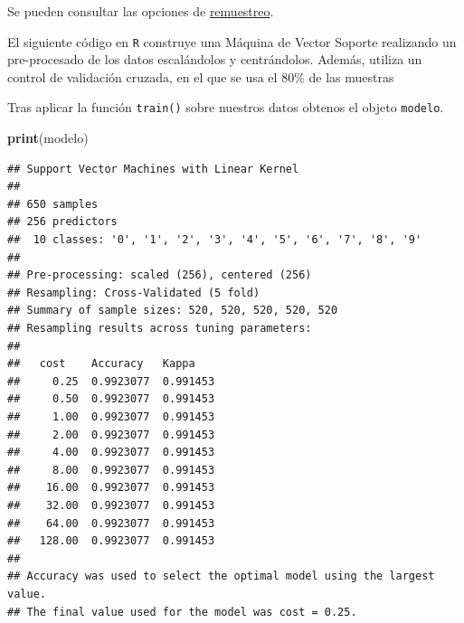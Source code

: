\documentclass[12pt,spanish,a4paper]{article}
\newenvironment{Shaded}{\begin{snugshade}}{\end{snugshade}}
\newcommand{\DataTypeTok}[1]{\textcolor[rgb]{0.13,0.29,0.53}{#1}}
\newcommand{\DecValTok}[1]{\textcolor[rgb]{0.00,0.00,0.81}{#1}}
\newcommand{\FloatTok}[1]{\textcolor[rgb]{0.00,0.00,0.81}{#1}}
\newcommand{\KeywordTok}[1]{\textcolor[rgb]{0.13,0.29,0.53}{\textbf{#1}}}
\newcommand{\NormalTok}[1]{#1}
\newcommand{\OperatorTok}[1]{\textcolor[rgb]{0.81,0.36,0.00}{\textbf{#1}}}
\newcommand{\OtherTok}[1]{\textcolor[rgb]{0.56,0.35,0.01}{#1}}
\newcommand{\StringTok}[1]{\textcolor[rgb]{0.31,0.60,0.02}{#1}}
\numberwithin{equation}{section}
\begin{document}
Se pueden consultar las opciones de
\href{http://topepo.github.io/caret/subsampling-for-class-imbalances.html}{remuestreo}.

El siguiente código en \texttt{R} construye una Máquina de Vector
Soporte realizando un pre-procesado de los datos escalándolos y
centrándolos. Además, utiliza un control de validación cruzada, en el
que se usa el 80\% de las muestras

\begin{Shaded}
\end{Shaded}

Tras aplicar la función \texttt{train()} sobre nuestros datos obtenos el
objeto \texttt{modelo}.

\begin{Shaded}
\begin{Highlighting}[]
\KeywordTok{print}\NormalTok{(modelo)}
\end{Highlighting}
\end{Shaded}

\begin{verbatim}
## Support Vector Machines with Linear Kernel 
## 
## 650 samples
## 256 predictors
##  10 classes: '0', '1', '2', '3', '4', '5', '6', '7', '8', '9' 
## 
## Pre-processing: scaled (256), centered (256) 
## Resampling: Cross-Validated (5 fold) 
## Summary of sample sizes: 520, 520, 520, 520, 520 
## Resampling results across tuning parameters:
## 
##   cost    Accuracy   Kappa   
##     0.25  0.9923077  0.991453
##     0.50  0.9923077  0.991453
##     1.00  0.9923077  0.991453
##     2.00  0.9923077  0.991453
##     4.00  0.9923077  0.991453
##     8.00  0.9923077  0.991453
##    16.00  0.9923077  0.991453
##    32.00  0.9923077  0.991453
##    64.00  0.9923077  0.991453
##   128.00  0.9923077  0.991453
## 
## Accuracy was used to select the optimal model using the largest value.
## The final value used for the model was cost = 0.25.
\end{verbatim}
\end{document}
